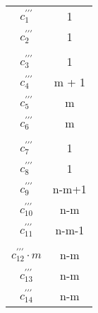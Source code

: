 \documentclass{article}
\begin{document}
    \begin{minipage}{0.70\textwidth}
        
    \end{minipage}
    \hfill
    \begin{minipage}{0.25\textwidth}
        \begin{tabular}{|c|c}
            $c^{\prime\prime\prime}_1            $ & 1     \\
            $c^{\prime\prime\prime}_2            $ & 1     \\
            $                                    $ &       \\
            $c^{\prime\prime\prime}_3            $ & 1     \\
            $c^{\prime\prime\prime}_4            $ & m + 1 \\
            $c^{\prime\prime\prime}_5            $ & m     \\
            $c^{\prime\prime\prime}_6            $ & m     \\
            $                                    $ &       \\
            $c^{\prime\prime\prime}_7            $ & 1     \\
            $c^{\prime\prime\prime}_8            $ & 1     \\
            $c^{\prime\prime\prime}_9            $ & n-m+1 \\
            $c^{\prime\prime\prime}_{10}         $ & n-m   \\
            $c^{\prime\prime\prime}_{11}         $ & n-m-1 \\
            $                                    $ &       \\
            $c^{\prime\prime\prime}_{12} \cdot m $ & n-m   \\
            $c^{\prime\prime\prime}_{13}         $ & n-m   \\
            $c^{\prime\prime\prime}_{14}         $ & n-m   \\

        \end{tabular}
    \end{minipage}
\end{document}
